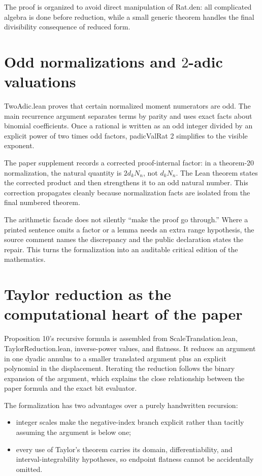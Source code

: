 \documentclass[11pt,a4paper,openany]{book}
\def\module#1{#1.lean}
\def\code#1{#1}
\newcommand{\module}[1]{\nolinkurl{#1.lean}}
\newcommand{\code}[1]{\texttt{\detokenize{#1}}}
\begin{document}
The proof is organized to avoid direct manipulation of
\code{Rat.den}: all complicated algebra is done before reduction, while a small
generic theorem handles the final divisibility consequence of reduced form.

\section{Odd normalizations and \texorpdfstring{$2$-adic}{2-adic} valuations}
\module{TwoAdic} proves that certain normalized moment numerators are odd.  The
main recurrence argument separates terms by parity and uses exact facts about
binomial coefficients.  Once a rational is written as an odd integer divided
by an explicit power of two times odd factors, \code{padicValRat 2} simplifies
to the visible exponent.

The paper supplement records a corrected proof-internal factor: in a theorem-20
normalization, the natural quantity is $2d_kN_n$, not $d_kN_n$.  The Lean theorem
states the corrected product and then strengthens it to an odd natural number.
This correction propagates cleanly because normalization facts are isolated
from the final numbered theorem.

\begin{correction}
The arithmetic facade does not silently “make the proof go through.”  Where a
printed sentence omits a factor or a lemma needs an extra range hypothesis, the
source comment names the discrepancy and the public declaration states the
repair.  This turns the formalization into an auditable critical edition of the
mathematics.
\end{correction}

\section{Taylor reduction as the computational heart of the paper}
Proposition 10's recursive formula is assembled from
\module{ScaleTranslation}, \module{TaylorReduction}, inverse-power values, and
flatness.  It reduces an argument in one dyadic annulus to a smaller translated
argument plus an explicit polynomial in the displacement.  Iterating the
reduction follows the binary expansion of the argument, which explains the
close relationship between the paper formula and the exact bit evaluator.

The formalization has two advantages over a purely handwritten recursion:
\begin{itemize}
  \item integer scales make the negative-index branch explicit rather than
        tacitly assuming the argument is below one;
  \item every use of Taylor's theorem carries its domain, differentiability,
        and interval-integrability hypotheses, so endpoint flatness cannot be
        accidentally omitted.
\end{itemize}
\end{document}

